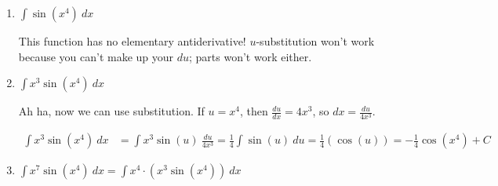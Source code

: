 \documentclass[10pt]{article}
\newenvironment{red}{\color{red}}{\ignorespacesafterend}
\newenvironment{blue}{\color{blue}}{\ignorespacesafterend}
\begin{document}
\begin{enumerate}[leftmargin=0pt]
\begin{enumerate}
\begin{blue}
    \[\begin{array}{ll}
        u = \ln(x^2) &  \\
         & dv = x\ dx
    \end{array}
    \textrm{ so }
    \begin{array}{ll}
        u = \ln(x^2) & v = \tfrac12 x^2 \\
        du = \frac{1}{x^2}\cdot 2x\ dx & dv = x\ dx 
    \end{array}
    \]
    
    Applying the integration by parts formula:
    \begin{align*}
        \int x\ln(x^2)\ dx &= \ln(x^2) \cdot \tfrac12 x^2 - 
        \int \frac12 x^2 \cdot \frac{1}{x^2} \cdot 2x\ dx \\
        &= \ln(x^2) \cdot \tfrac12 x^2 - \int x\ dx \textrm{ (!!)} \\
        &= \frac12 x^2 \ln(x^2) - \frac12 x^2 + C
    \end{align*}
    \end{blue}
    
    \item $\int \sin(x^4)\ dx$
    
    \begin{red}
    This function has no elementary antiderivative! $u$-substitution won't work because you can't make up your $du$; parts won't work either.
    \end{red}
    
    \item $\int x^3\sin(x^4)\ dx$
    
    \begin{red}
    Ah ha, now we can use substitution. If $u = x^4$, then $\frac{du}{dx} = 4x^3$, so $dx = \frac{du}{4x^3}$.
    
    \begin{align*}
        \int x^3\sin(x^4)\ dx &= \int x^3 \sin(u)\ \frac{du}{4x^3} = \frac14 \int \sin(u)\ du = \frac14(\cos(u)) = -\frac14\cos(x^4)+ C
    \end{align*}
    \end{red}
    
    \item $\int x^7 \sin(x^4)\ dx = \int x^4\cdot (x^3\sin(x^4))\ dx$
    

\end{enumerate}
\end{enumerate}
\end{document}
